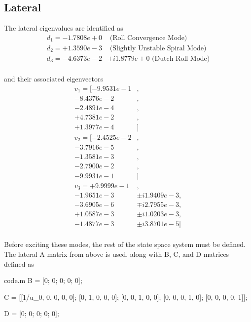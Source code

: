\documentclass[12pt]{article}
\begin{document}
\clearpage
\subsection{Lateral}
\noindent The lateral eigenvalues are identified as
\begin{equation*}
\begin{split}
d_1 = -1.7808e+0 & \mbox{ (Roll Convergence Mode)}\\
d_2 = +1.3590e-3 & \mbox{ (Slightly Unstable Spiral Mode)}\\
d_3 = -4.6373e-2 &\pm i 1.8779e+0 \mbox{ (Dutch Roll Mode)} \\
\end{split}
\end{equation*}

\noindent and their associated eigenvectors
\begin{equation*}
\begin{split}
v_1 = [-9.9531e-1 &, \\
       -8.4376e-2 &, \\
       -2.4891e-4 &, \\
       +4.7381e-2 &, \\
       +1.3977e-4 &] \\
v_2 = [-2.4525e-2 &, \\
       -3.7916e-5 &, \\
       -1.3581e-3 &, \\
       -2.7900e-2 &, \\
       -9.9931e-1 &] \\
v_3 =  +9.9999e-1 &, \\
       -1.9651e-3 & \pm i 1.9409e-3, \\
       -3.6905e-6 & \mp i 2.7955e-3, \\
       +1.0587e-3 & \pm i 1.0203e-3, \\
       -1.4877e-3 & \pm i 3.8701e-5] \\
\end{split}
\end{equation*}

\noindent Before exciting these modes, the rest of the state space system must be defined. The lateral A matrix from above is used, along with B, C, and D matrices defined as
\begin{filecontents*}{code.m}
B = [0; 0; 0; 0; 0];

C = [[1/u_0, 0, 0, 0, 0];
     [0, 1, 0, 0, 0];
     [0, 0, 1, 0, 0];
     [0, 0, 0, 1, 0];
     [0, 0, 0, 0, 1]];

D = [0; 0; 0; 0; 0];
\end{filecontents*}

\end{document}
